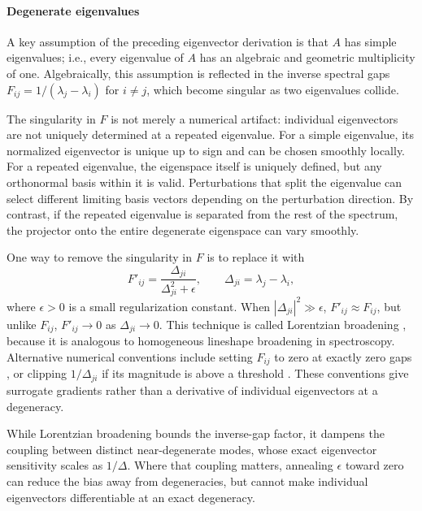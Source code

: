 \documentclass[11pt, a4paper]{article}
\begin{document}
\paragraph{Degenerate eigenvalues}
A key assumption of the preceding eigenvector derivation is that $A$ has simple eigenvalues; i.e., every eigenvalue of $A$ has an algebraic and geometric multiplicity of one. Algebraically, this assumption is reflected in the inverse spectral gaps $F_{ij}=1/(\lambda_j-\lambda_i)$ for $i\ne j$, which become singular as two eigenvalues collide.

The singularity in $F$ is not merely a numerical artifact: individual eigenvectors are not uniquely determined at a repeated eigenvalue. For a simple eigenvalue, its normalized eigenvector is unique up to sign and can be chosen smoothly locally. For a repeated eigenvalue, the eigenspace itself is uniquely defined, but any orthonormal basis within it is valid. Perturbations that split the eigenvalue can select different limiting basis vectors depending on the perturbation direction. By contrast, if the repeated eigenvalue is separated from the rest of the spectrum, the projector onto the entire degenerate eigenspace can vary smoothly.

One way to remove the singularity in $F$ is to replace it with
\begin{equation}
    F'_{ij} = \frac{\Delta_{ji}}{\Delta_{ji}^2 + \epsilon}, \qquad \Delta_{ji}=\lambda_j-\lambda_i,
\end{equation}
where $\epsilon>0$ is a small regularization constant. When $|\Delta_{ji}|^2 \gg \epsilon$, $F'_{ij}\approx F_{ij}$, but unlike $F_{ij}$, $F'_{ij} \to 0$ as $\Delta_{ji}\to 0$. This technique is called Lorentzian broadening \cite{liao2019}, because it is analogous to homogeneous lineshape broadening in spectroscopy. Alternative numerical conventions include setting $F_{ij}$ to zero at exactly zero gaps \cite{gh_issue}, or clipping $1/\Delta_{ji}$ if its magnitude is above a threshold \cite{seeger2019autodifferentiatinglinearalgebra}. These conventions give surrogate gradients rather than a derivative of individual eigenvectors at a degeneracy.

While Lorentzian broadening bounds the inverse-gap factor, it dampens the coupling between distinct near-degenerate modes, whose exact eigenvector sensitivity scales as $1/\Delta$. Where that coupling matters, annealing $\epsilon$ toward zero can reduce the bias away from degeneracies, but cannot make individual eigenvectors differentiable at an exact degeneracy.
\end{document}
